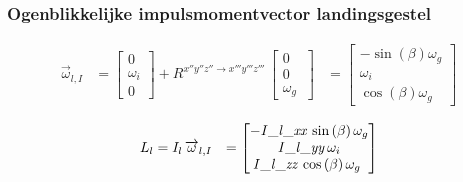 \subsubsection{Ogenblikkelijke impulsmomentvector landingsgestel}
\begin{equation*}
\begin{split}
\overrightarrow{\omega}_{l,I}
&=\begin{bmatrix}
0\\
\omega_{i}\\
0\
\end{bmatrix}
+R^{x''y''z'' \rightarrow x'''y'''z'''}\,
\begin{bmatrix}
0\\
0\\
\omega_{g}\
\end{bmatrix}
&=\begin{bmatrix}
-\sin \left( \beta \right) \omega_{g}
\\
\omega_{i}\\
\cos \left( \beta
 \right) \omega_{g}\
\end{bmatrix}
\end{split}
\end{equation*}

\begin{equation*}
\begin{split}
L_{l}&=I_{l}\,\overrightarrow{\omega}_{l,I}&=
\begin{bmatrix}
-{\it I\_l\_xx}\,\sin \left( \beta \right) 
\omega_{g}\\
{\it I\_l\_yy}\,\omega_{i}
\\
{\it I\_l\_zz}\,\cos \left( \beta \right) \omega_
{g}\
\end{bmatrix}
\end{split}
\end{equation*}

